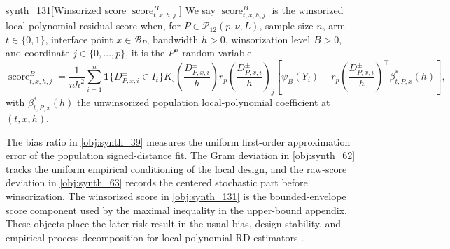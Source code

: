 \begin{definitionv}{synth_131}[Winsorized score \(\operatorname{score}^{B}_{t,x,h,j}\)]
We say \(\operatorname{score}^{B}_{t,x,h,j}\) is the winsorized local-polynomial residual score when, for \(P\in\mathcal P_{12}(p,\nu,L)\), sample size \(n\), arm \(t\in\{0,1\}\), interface point \(x\in\mathcal B_P\), bandwidth \(h>0\), winsorization level \(B>0\), and coordinate \(j\in\{0,\ldots,p\}\), it is the \(P^n\)-random variable\[\operatorname{score}^{B}_{t,x,h,j}=\frac{1}{n h^2}\sum_{i=1}^n\mathbf 1\{D^{\pm}_{P,x,i}\in I_t\}K_\square\!\left(\frac{D^{\pm}_{P,x,i}}{h}\right)r_p\!\left(\frac{D^{\pm}_{P,x,i}}{h}\right)_j\left[\psi_B(Y_i)-r_p\!\left(\frac{D^{\pm}_{P,x,i}}{h}\right)^\top\beta^*_{t,P,x}(h)\right],\]with \(\beta^*_{t,P,x}(h)\) the unwinsorized population local-polynomial coefficient at \((t,x,h)\).
\end{definitionv}

The bias ratio in \cref{obj:synth_39} measures the uniform first-order approximation error of the population signed-distance fit. The Gram deviation in \cref{obj:synth_62} tracks the uniform empirical conditioning of the local design, and the raw-score deviation in \cref{obj:synth_63} records the centered stochastic part before winsorization. The winsorized score in \cref{obj:synth_131} is the bounded-envelope score component used by the maximal inequality in the upper-bound appendix. These objects place the later risk result in the usual bias, design-stability, and empirical-process decomposition for local-polynomial RD estimators \citep{Fan1996,Ruppert1994,Calonico2014,Calonico2020,VanderVaart1996}.
